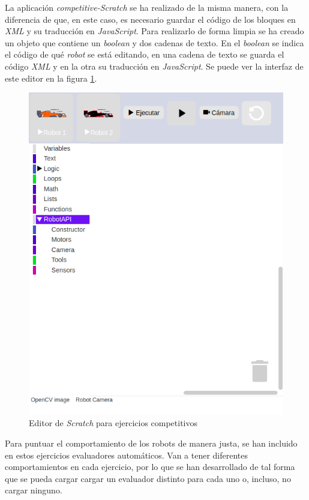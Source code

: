 La aplicación \textit{competitive-Scratch} se ha realizado de la misma manera, con la diferencia de que, en este caso, es necesario guardar el código de los bloques en \textit{XML} y su traducción en \textit{JavaScript}. Para realizarlo de forma limpia se ha creado un objeto que contiene un \textit{boolean} y dos cadenas de texto. En el \textit{boolean} se indica el código de qué \textit{robot} se está editando, en una cadena de texto se guarda el código \textit{XML} y en la otra su traducción en \textit{JavaScript}. Se puede ver la interfaz de este editor en la figura \ref{fig:scratch_competitivo}.

    \begin{figure}[h]
        \centering            
        \includegraphics[scale=0.30]{img/competitivoEditorScratch.png}
        \caption{Editor de \textit{Scratch} para ejercicios competitivos}
        \label{fig:scratch_competitivo}
    \end{figure}
    
Para puntuar el comportamiento de los robots de manera justa, se han incluido en estos ejercicios evaluadores automáticos. Van a tener diferentes comportamientos en cada ejercicio, por lo que se han desarrollado de tal forma que se pueda cargar cargar un evaluador distinto para cada uno o, incluso, no cargar ninguno. \newline

